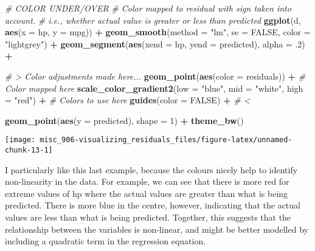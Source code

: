 \documentclass[]{book}
\newenvironment{Shaded}{\begin{snugshade}}{\end{snugshade}}
\newcommand{\CommentTok}[1]{\textcolor[rgb]{0.56,0.35,0.01}{\textit{#1}}}
\newcommand{\DataTypeTok}[1]{\textcolor[rgb]{0.13,0.29,0.53}{#1}}
\newcommand{\DecValTok}[1]{\textcolor[rgb]{0.00,0.00,0.81}{#1}}
\newcommand{\FloatTok}[1]{\textcolor[rgb]{0.00,0.00,0.81}{#1}}
\newcommand{\KeywordTok}[1]{\textcolor[rgb]{0.13,0.29,0.53}{\textbf{#1}}}
\newcommand{\NormalTok}[1]{#1}
\newcommand{\OperatorTok}[1]{\textcolor[rgb]{0.81,0.36,0.00}{\textbf{#1}}}
\newcommand{\OtherTok}[1]{\textcolor[rgb]{0.56,0.35,0.01}{#1}}
\newcommand{\StringTok}[1]{\textcolor[rgb]{0.31,0.60,0.02}{#1}}
\begin{document}
\begin{Shaded}
\begin{Highlighting}[]
\CommentTok{# COLOR UNDER/OVER}
\CommentTok{# Color mapped to residual with sign taken into account.}
\CommentTok{# i.e., whether actual value is greater or less than predicted}
\KeywordTok{ggplot}\NormalTok{(d, }\KeywordTok{aes}\NormalTok{(}\DataTypeTok{x =}\NormalTok{ hp, }\DataTypeTok{y =}\NormalTok{ mpg)) }\OperatorTok{+}
\StringTok{  }\KeywordTok{geom_smooth}\NormalTok{(}\DataTypeTok{method =} \StringTok{"lm"}\NormalTok{, }\DataTypeTok{se =} \OtherTok{FALSE}\NormalTok{, }\DataTypeTok{color =} \StringTok{"lightgrey"}\NormalTok{) }\OperatorTok{+}
\StringTok{  }\KeywordTok{geom_segment}\NormalTok{(}\KeywordTok{aes}\NormalTok{(}\DataTypeTok{xend =}\NormalTok{ hp, }\DataTypeTok{yend =}\NormalTok{ predicted), }\DataTypeTok{alpha =} \FloatTok{.2}\NormalTok{) }\OperatorTok{+}

\StringTok{  }\CommentTok{# > Color adjustments made here...}
\StringTok{  }\KeywordTok{geom_point}\NormalTok{(}\KeywordTok{aes}\NormalTok{(}\DataTypeTok{color =}\NormalTok{ residuals)) }\OperatorTok{+}\StringTok{  }\CommentTok{# Color mapped here}
\StringTok{  }\KeywordTok{scale_color_gradient2}\NormalTok{(}\DataTypeTok{low =} \StringTok{"blue"}\NormalTok{, }\DataTypeTok{mid =} \StringTok{"white"}\NormalTok{, }\DataTypeTok{high =} \StringTok{"red"}\NormalTok{) }\OperatorTok{+}\StringTok{  }\CommentTok{# Colors to use here}
\StringTok{  }\KeywordTok{guides}\NormalTok{(}\DataTypeTok{color =} \OtherTok{FALSE}\NormalTok{) }\OperatorTok{+}
\StringTok{  }\CommentTok{# <}

\StringTok{  }\KeywordTok{geom_point}\NormalTok{(}\KeywordTok{aes}\NormalTok{(}\DataTypeTok{y =}\NormalTok{ predicted), }\DataTypeTok{shape =} \DecValTok{1}\NormalTok{) }\OperatorTok{+}
\StringTok{  }\KeywordTok{theme_bw}\NormalTok{()}
\end{Highlighting}
\end{Shaded}

\begin{center}\texttt{[image: misc\_906-visualizing\_residuals\_files/figure-latex/unnamed-chunk-13-1]} \end{center}

I particularly like this last example, because the colours nicely help to identify non-linearity in the data. For example, we can see that there is more red for extreme values of hp where the actual values are greater than what is being predicted. There is more blue in the centre, however, indicating that the actual values are less than what is being predicted. Together, this suggests that the relationship between the variables is non-linear, and might be better modelled by including a quadratic term in the regression equation.
\end{document}
